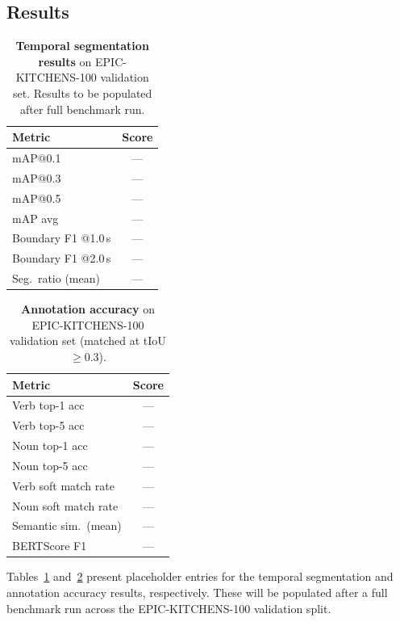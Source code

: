 \documentclass[10pt,twocolumn]{article}
\begin{document}
\subsection{Results}

\begin{table}[t]
  \centering
  \caption{%
    \textbf{Temporal segmentation results} on EPIC-KITCHENS-100
    validation set.  Results to be populated after full benchmark
    run.
  }
  \label{tab:temporal}
  \small
  \begin{tabular}{lc}
    \toprule
    \textbf{Metric} & \textbf{Score} \\
    \midrule
    mAP@0.1 & --- \\
    mAP@0.3 & --- \\
    mAP@0.5 & --- \\
    mAP avg  & --- \\
    \midrule
    Boundary F1 @1.0\,s & --- \\
    Boundary F1 @2.0\,s & --- \\
    \midrule
    Seg.\ ratio (mean) & --- \\
    \bottomrule
  \end{tabular}
\end{table}

\begin{table}[t]
  \centering
  \caption{%
    \textbf{Annotation accuracy} on EPIC-KITCHENS-100 validation
    set (matched at tIoU $\geq 0.3$).
  }
  \label{tab:annotation}
  \small
  \begin{tabular}{lc}
    \toprule
    \textbf{Metric} & \textbf{Score} \\
    \midrule
    Verb top-1 acc  & --- \\
    Verb top-5 acc  & --- \\
    Noun top-1 acc  & --- \\
    Noun top-5 acc  & --- \\
    \midrule
    Verb soft match rate & --- \\
    Noun soft match rate & --- \\
    \midrule
    Semantic sim.\ (mean) & --- \\
    BERTScore F1          & --- \\
    \bottomrule
  \end{tabular}
\end{table}

Tables~\ref{tab:temporal} and~\ref{tab:annotation} present
placeholder entries for the temporal segmentation and annotation
accuracy results, respectively.  These will be populated after a
full benchmark run across the EPIC-KITCHENS-100 validation split.
\end{document}
